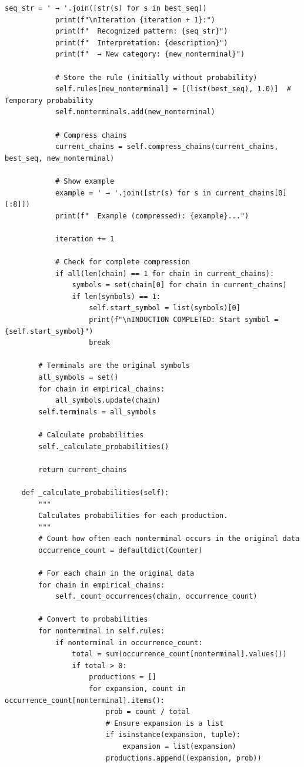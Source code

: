 \documentclass[
  12pt,
  a4paper,
  oneside,
  titlepage
]{article}
\begin{document}
\begin{lstlisting}[caption=Algorithmic Recursive Sequence Analysis 3.0 - Hierarchical Grammar Induction]
            seq_str = ' → '.join([str(s) for s in best_seq])
            print(f"\nIteration {iteration + 1}:")
            print(f"  Recognized pattern: {seq_str}")
            print(f"  Interpretation: {description}")
            print(f"  → New category: {new_nonterminal}")
            
            # Store the rule (initially without probability)
            self.rules[new_nonterminal] = [(list(best_seq), 1.0)]  # Temporary probability
            self.nonterminals.add(new_nonterminal)
            
            # Compress chains
            current_chains = self.compress_chains(current_chains, best_seq, new_nonterminal)
            
            # Show example
            example = ' → '.join([str(s) for s in current_chains[0][:8]])
            print(f"  Example (compressed): {example}...")
            
            iteration += 1
            
            # Check for complete compression
            if all(len(chain) == 1 for chain in current_chains):
                symbols = set(chain[0] for chain in current_chains)
                if len(symbols) == 1:
                    self.start_symbol = list(symbols)[0]
                    print(f"\nINDUCTION COMPLETED: Start symbol = {self.start_symbol}")
                    break
        
        # Terminals are the original symbols
        all_symbols = set()
        for chain in empirical_chains:
            all_symbols.update(chain)
        self.terminals = all_symbols
        
        # Calculate probabilities
        self._calculate_probabilities()
        
        return current_chains
    
    def _calculate_probabilities(self):
        """
        Calculates probabilities for each production.
        """
        # Count how often each nonterminal occurs in the original data
        occurrence_count = defaultdict(Counter)
        
        # For each chain in the original data
        for chain in empirical_chains:
            self._count_occurrences(chain, occurrence_count)
        
        # Convert to probabilities
        for nonterminal in self.rules:
            if nonterminal in occurrence_count:
                total = sum(occurrence_count[nonterminal].values())
                if total > 0:
                    productions = []
                    for expansion, count in occurrence_count[nonterminal].items():
                        prob = count / total
                        # Ensure expansion is a list
                        if isinstance(expansion, tuple):
                            expansion = list(expansion)
                        productions.append((expansion, prob))
                    

\end{lstlisting}
\end{document}
